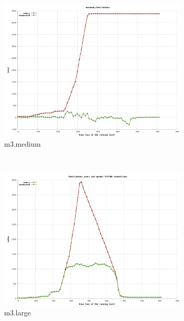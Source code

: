 \documentclass[dvips,12pt]{article}
\begin{document}
\begin{figure}[h!]
    \centering
    \begin{subfigure}[b]{0.3\textwidth}
        \includegraphics[width=\textwidth]{images/vertical/users_simul_medium.png}
        \caption{m3.medium}
    \end{subfigure}
    ~ 
    \begin{subfigure}[b]{0.3\textwidth}
        \includegraphics[width=\textwidth]{images/vertical/users_simul_large.png}
        \caption{m3.large}
    \end{subfigure}
    ~ 
    \begin{subfigure}[b]{0.3\textwidth}

\end{subfigure}
\end{figure}
\end{document}
